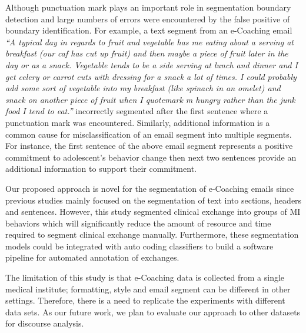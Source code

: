 \documentclass{amia}
\begin{document}
Although punctuation mark plays an important role in segmentation boundary detection and large numbers of errors were encountered by the false positive of boundary identification. For example, a text segment from an e-Coaching email \textit{``A typical day in regards to fruit and vegetable has me eating about a serving at breakfast (our caf has cut up fruit) and then maybe a piece of fruit later in the day or as a snack. Vegetable tends to be a side serving at lunch and dinner and I get celery or carrot cuts with dressing for a snack a lot of times. I could probably add some sort of vegetable into my breakfast (like spinach in an omelet) and snack on another piece of fruit when I quotemark m hungry rather than the junk food I tend to eat.''} incorrectly segmented after the first sentence where a punctuation mark was encountered. Similarly, additional information is a common cause for misclassification of an email segment into multiple segments. For instance, the first sentence of the above email segment represents a positive commitment to adolescent's behavior change then next two sentences provide an additional information to support their commitment. 

Our proposed approach is novel for the segmentation of e-Coaching emails since previous studies mainly focused on the segmentation of text into sections, headers and sentences. However, this study segmented clinical exchange into groups of MI behaviors which will significantly reduce the amount of resource and time required to segment clinical exchange manually. Furthermore, these segmentation models could be integrated with auto coding classifiers to build a software pipeline for automated annotation of exchanges.

The limitation of this study is that e-Coaching data is collected from a single medical institute; formatting, style and email segment can be different in other settings. Therefore, there is a need to replicate the experiments with different data sets. As our future work, we plan to evaluate our approach to other datasets for discourse analysis. 
 
\end{document}

